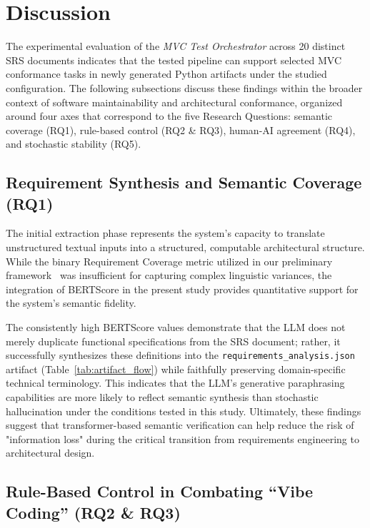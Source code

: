 \section{Discussion}
\label{sec:discussion}

The experimental evaluation of the \textit{MVC Test Orchestrator}
across 20 distinct SRS documents indicates that the tested pipeline can support selected MVC conformance tasks in newly generated Python artifacts under the studied configuration. The following
subsections discuss these findings within the broader context of
software maintainability and architectural conformance,
organized around four axes that correspond to the five Research
Questions: semantic coverage (RQ1), rule-based control (RQ2 \& RQ3), 
human-AI agreement (RQ4), and stochastic stability (RQ5).

\subsection{Requirement Synthesis and Semantic Coverage (RQ1)}

The initial extraction phase represents the system's capacity to translate unstructured textual inputs into a structured, computable architectural structure. While the binary Requirement Coverage metric utilized in our preliminary framework~\citep{dim2026mvc} was insufficient for capturing complex linguistic variances, the integration of BERTScore in the present study provides quantitative support for the system's semantic fidelity. 

The consistently high BERTScore values demonstrate that the LLM does not merely duplicate functional specifications from the SRS document; rather, it successfully synthesizes these definitions into the \texttt{requirements\_analysis.json} artifact (Table~\ref{tab:artifact_flow}) while faithfully preserving domain-specific technical terminology. This indicates that the LLM's generative paraphrasing capabilities are more likely to reflect semantic synthesis than stochastic hallucination under the conditions tested in this study. Ultimately, these findings suggest that transformer-based semantic verification can help reduce the risk of "information loss" during the critical transition from requirements engineering to architectural design.


\subsection{Rule-Based Control in Combating ``Vibe Coding'' (RQ2 \& RQ3)}

